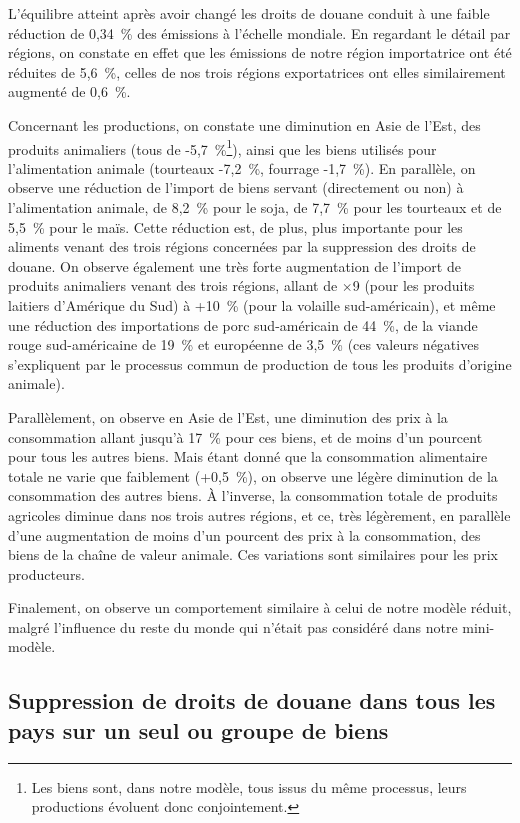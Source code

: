 L'équilibre atteint après avoir changé les droits de douane conduit à une faible réduction de 0,34~\% des émissions à l'échelle mondiale. En regardant le détail par régions, on constate en effet que les émissions de notre région importatrice ont été réduites de 5,6~\%, celles de nos trois régions exportatrices ont elles similairement augmenté de 0,6~\%.

Concernant les productions, on constate une diminution en Asie de l'Est, des produits animaliers (tous de -5,7~\%\footnote{Les biens sont, dans notre modèle, tous issus du même processus, leurs productions évoluent donc conjointement.}), ainsi que les biens utilisés pour l'alimentation animale (tourteaux -7,2~\%, fourrage -1,7~\%). En parallèle, on observe une réduction de l'import de biens servant (directement ou non) à l'alimentation animale, de 8,2~\% pour le soja, de 7,7~\% pour les tourteaux et de 5,5~\% pour le maïs. Cette réduction est, de plus, plus importante pour les aliments venant des trois régions concernées par la suppression des droits de douane. On observe également une très forte augmentation de l'import de produits animaliers venant des trois régions, allant de $\times$9 (pour les produits laitiers d'Amérique du Sud) à +10~\% (pour la volaille sud-américain), et même une réduction des importations de porc sud-américain de 44~\%, de la viande rouge sud-américaine de 19~\% et européenne de 3,5~\% (ces valeurs négatives s'expliquent par le processus commun de production de tous les produits d'origine animale).

Parallèlement, on observe en Asie de l'Est, une diminution des prix à la consommation allant jusqu'à 17~\% pour ces biens, et de moins d'un pourcent pour tous les autres biens. Mais étant donné que la consommation alimentaire totale ne varie que faiblement (+0,5~\%), on observe une légère diminution de la consommation des autres biens. À l'inverse, la consommation totale de produits agricoles diminue dans nos trois autres régions, et ce, très légèrement, en parallèle d'une augmentation de moins d'un pourcent des prix à la consommation, des biens de la chaîne de valeur animale. Ces variations sont similaires pour les prix producteurs.

Finalement, on observe un comportement similaire à celui de notre modèle réduit, malgré l'influence du reste du monde qui n'était pas considéré dans notre mini-modèle.


\subsection{Suppression de droits de douane dans tous les pays sur un seul ou groupe de biens}

